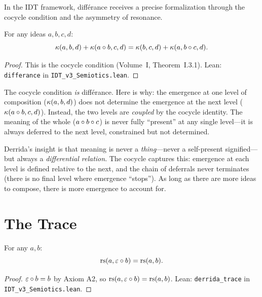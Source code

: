 In the IDT framework, diff\'erance receives a precise formalization through the
cocycle condition and the asymmetry of resonance.

\begin{theorem}
\label{thm:differance}
For any ideas $a, b, c, d$:
\[
\kappa(a, b, d) + \kappa(a \circ b, c, d) =
\kappa(b, c, d) + \kappa(a, b \circ c, d).
\]
\end{theorem}

\begin{proof}
This is the cocycle condition (Volume~I, Theorem~I.3.1).
Lean: \texttt{differance} in \texttt{IDT\_v3\_Semiotics.lean}.
\end{proof}

\begin{interpretation}
\label{interp:differance}
The cocycle condition \emph{is} diff\'erance. Here is why: the emergence at
one level of composition ($\kappa(a, b, d)$) does not determine the emergence
at the next level ($\kappa(a \circ b, c, d)$). Instead, the two levels are
\emph{coupled} by the cocycle identity. The meaning of the whole ($a \circ
b \circ c$) is never fully ``present'' at any single level---it is always
deferred to the next level, constrained but not determined.

Derrida's insight is that meaning is never a \emph{thing}---never a self-present
signified---but always a \emph{differential relation}. The cocycle captures this:
emergence at each level is defined relative to the next, and the chain of
deferrals never terminates (there is no final level where emergence ``stops'').
As long as there are more ideas to compose, there is more emergence to account
for.
\end{interpretation}

\section{The Trace}

\begin{theorem}
\label{thm:trace}
For any $a, b$:
\[
\mathrm{rs}(a, \varepsilon \circ b) = \mathrm{rs}(a, b).
\]
\end{theorem}

\begin{proof}
$\varepsilon \circ b = b$ by Axiom A2, so $\mathrm{rs}(a, \varepsilon \circ b) = \mathrm{rs}(a, b)$.
Lean: \texttt{derrida\_trace} in \texttt{IDT\_v3\_Semiotics.lean}.
\end{proof}

